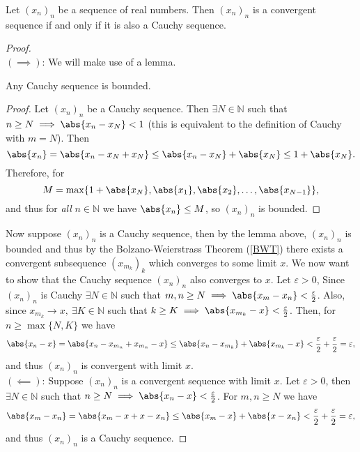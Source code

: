 \documentclass[../real_analysis.tex]{subfiles}
\begin{document}
        \begin{theorem}
            Let $(x_n)_n$ be a sequence of real numbers. Then $(x_n)_n$ is a convergent sequence if and only if it is also a Cauchy sequence.
        \end{theorem}
        \begin{proof}\\
            $(\implies)$: We will make use of a lemma.
            \begin{lemma}
                Any Cauchy sequence is bounded.
            \end{lemma}
            \begin{proof}
                Let $(x_n)_n$ be a Cauchy sequence. Then $\exists N\in\mathbb{N}$ such that $n\geq N\implies\abs{x_n-x_N}<1$ (this is equivalent to the definition of Cauchy with $m=N$). Then
                \begin{equation*}
                    \abs{x_n}=\abs{x_n-x_N+x_N}\leq\abs{x_n-x_N}+\abs{x_N}\leq 1+\abs{x_N}.
                \end{equation*}
                Therefore, for
                \begin{equation*}
                    M=\max\{1+\abs{x_N},\abs{x_1},\abs{x_2},\dots,\abs{x_{N-1}}\},
                \end{equation*}
                and thus for \textit{all} $n\in\mathbb{N}$ we have $\abs{x_n}\leq M$, so $(x_n)_n$ is bounded.
            \end{proof}
            Now suppose $(x_n)_n$ is a Cauchy sequence, then by the lemma above, $(x_n)_n$ is bounded and thus by the Bolzano-Weierstrass Theorem (\ref{BWT}) there exists a convergent subsequence $(x_{m_k})_k$ which converges to some limit $x$. We now want to show that the Cauchy sequence $(x_n)_n$ also converges to $x$. Let $\varepsilon>0$, Since $(x_n)_n$ is Cauchy $\exists N\in\mathbb{N}$ such that $m,n\geq N\implies\abs{x_m-x_n}<\frac{\varepsilon}{2}$. Also, since $x_{m_k}\to x,\ \exists K\in\mathbb{N}$ such that $k\geq K\implies\abs{x_{m_k}-x}<\frac{\varepsilon}{2}$. Then, for $n\geq\max\{N,K\}$ we have
            \begin{equation*}
                \abs{x_n-x}=\abs{x_n-x_{m_n}+x_{m_n}-x}\leq\abs{x_n-x_{m_k}}+\abs{x_{m_k}-x}<\frac{\varepsilon}{2}+\frac{\varepsilon}{2}=\varepsilon,
            \end{equation*}
            and thus $(x_n)_n$ is convergent with limit $x$.\\
            $(\impliedby)$: Suppose $(x_n)_n$ is a convergent sequence with limit $x$. Let $\varepsilon>0$, then $\exists N\in\mathbb{N}$ such that $n\geq N\implies\abs{x_n-x}<\frac{\varepsilon}{2}$. For $m,n\geq N$ we have
            \begin{equation*}
                \abs{x_m-x_n}=\abs{x_m-x+x-x_n}\leq\abs{x_m-x}+\abs{x-x_n}<\frac{\varepsilon}{2}+\frac{\varepsilon}{2}=\varepsilon,
            \end{equation*}
            and thus $(x_n)_n$ is a Cauchy sequence.
        \end{proof}
\end{document}
